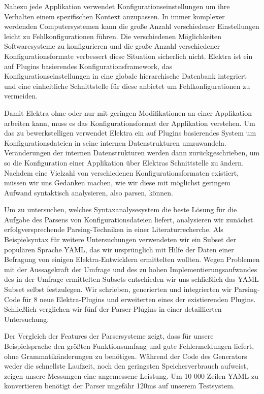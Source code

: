 \begin{kurzfassung}
\begin{sloppypar}
Nahezu jede Applikation verwendet Konfigurationseinstellungen um ihre Verhalten einem spezifischen Kontext anzupassen. In immer komplexer werdenden Computersystemen kann die große Anzahl verschiedener Einstellungen leicht zu Fehlkonfigurationen führen. Die verschiedenen Möglichkeiten Softwaresysteme zu konfigurieren und die große Anzahl verschiedener Konfigurationsformate verbessert diese Situation sicherlich nicht. Elektra ist ein auf Plugins basierendes Konfigurationsframework, das Konfigurationseinstellungen in eine globale hierarchische Datenbank integriert und eine einheitliche Schnittstelle für diese anbietet um Fehlkonfigurationen zu vermeiden.
\end{sloppypar}

Damit Elektra ohne oder nur mit geringen Modifikationen an einer Applikation arbeiten kann, muss es das Konfigurationsformat der Applikation verstehen. Um das zu bewerkstelligen verwendet Elektra ein auf Plugins basierendes System um Konfigurationsdateien in seine internen Datenstrukturen umzuwandeln. Veränderungen der internen Datenstrukturen werden dann zurückgeschrieben, um so die Konfiguration einer Applikation über Elektras Schnittstelle zu ändern. Nachdem eine Vielzahl von verschiedenen Konfigurationsformaten existiert, müssen wir uns Gedanken machen, wie wir diese mit möglichst geringem Aufwand syntaktisch analysieren, also parsen, können.

Um zu untersuchen, welches Syntaxanalysesystem die beste Lösung für die Aufgabe des Parsens von Konfigurationsdateien liefert, analysieren wir zunächst erfolgversprechende Parsing-Techniken in einer Literaturrecherche. Als Beispielsyntax für weitere Untersuchungen verwendeten wir ein Subset der populären Sprache YAML, das wir ursprünglich mit Hilfe der Daten einer Befragung von einigen Elektra-Entwicklern ermittelten wollten. Wegen Problemen mit der Aussagekraft der Umfrage und des zu hohen Implementierungsaufwandes des in der Umfrage ermittelten Subsets entschieden wir uns schließlich das YAML Subset selbst festzulegen. Wir schrieben, generierten und integrierten wir Parsing-Code für 8 neue Elektra-Plugins und erweiterten eines der existierenden Plugins. Schließlich verglichen wir fünf der Parser-Plugins in einer detaillierten Untersuchung.

Der Vergleich der Features der Parsersysteme zeigt, dass für unsere Beispielsprache  den größten Funktionsumfang und gute Fehlermeldungen liefert, ohne Grammatikänderungen zu benötigen. Während der Code des Generators weder die schnellste Laufzeit, noch den geringsten Speicherverbrauch aufweist, zeigen unsere Messungen eine angemessene Leistung. Um 10 000 Zeilen YAML zu konvertieren benötigt der Parser ungefähr 120ms auf unserem Testsystem.
\end{kurzfassung}
